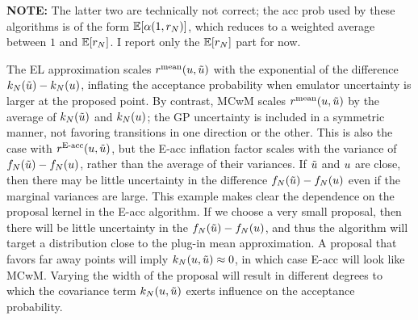 \documentclass[12pt]{article}
\begin{document}
\textbf{NOTE:} The latter two are technically not correct; the acc prob used by these algorithms
is of the form $\mathbb{E}[\alpha(1, r_N)]$, which reduces to a weighted average between $1$ and 
$\mathbb{E}[r_N]$. I report only the $\mathbb{E}[r_N]$ part for now.

\vspace 

The EL approximation scales $r^{\mathrm{mean}}(u, \tilde{u})$ with the exponential of the difference
$k_{N}(\tilde{u}) - k_{N}(u)$, inflating the acceptance probability when emulator uncertainty is 
larger at the proposed point. By contrast, MCwM scales $r^{\mathrm{mean}}(u, \tilde{u})$ by 
the average of $k_{N}(\tilde{u})$ and $k_{N}(u)$; the GP uncertainty is included in a 
symmetric manner, not favoring transitions in one direction or the other. This is also the case 
with $r^{\textrm{E-acc}}(u, \tilde{u})$, but the E-acc inflation factor scales with the 
variance of $f_{N}(\tilde{u}) - f_{N}(u)$, rather than the average of their variances.
If $\tilde{u}$ and $u$ are close, then there may be little uncertainty in the difference
$f_{N}(\tilde{u}) - f_{N}(u)$ even if the marginal variances are large. This example 
makes clear the dependence on the proposal kernel in the E-acc algorithm. If we choose a 
very small proposal, then there will be little uncertainty in the $f_{N}(\tilde{u}) - f_{N}(u)$,
and thus the algorithm will target a distribution close to the plug-in mean approximation.
A proposal that favors far away points will imply $k_{N}(u, \tilde{u}) \approx 0$, in which 
case E-acc will look like MCwM. Varying the width of the proposal will result in different 
degrees to which the covariance term $k_{N}(u, \tilde{u})$ exerts influence on 
the acceptance probability.
\end{document}
